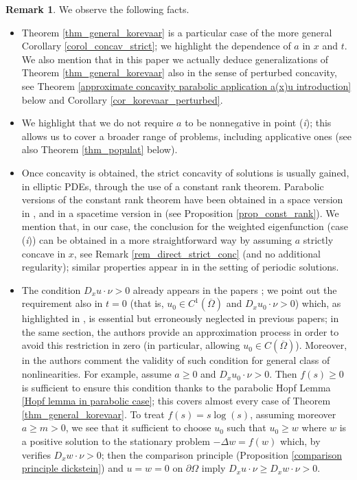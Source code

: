 \documentclass[11pt, reqno]{amsart}
\theoremstyle{definition}
\newtheorem{remark}[lemma]{Remark}
\numberwithin{equation}{section}
\newcommand{\Omegabar}{\overline{\Omega}}
\begin{document}
\begin{remark}
We observe the following facts.
\begin{itemize}
\item Theorem \ref{thm_general_korevaar} is a particular case of the more general Corollary \ref{corol_concav_strict}; we highlight the dependence of $a$ in $x$ and $t$. 
We also mention that in this paper we actually deduce generalizations of Theorem \ref{thm_general_korevaar} also in the sense of perturbed concavity, see Theorem \ref{approximate concavity parabolic application a(x)u introduction} below and Corollary \ref{cor_korevaar_perturbed}.

\item We highlight that we do not require $a$ to be nonnegative in point (\textit{i}); this allows us to cover a broader range of problems, including applicative ones (see also Theorem \ref{thm_populat} below).


\item Once concavity is obtained, the strict concavity of solutions is usually gained, in elliptic PDEs, through the use of a constant rank theorem. 
Parabolic versions of the constant rank theorem have been obtained in a space version in \cite{BianGuan2009, CaffareliGuanMa2007}, and in a spacetime version in \cite{chen2014, ChenHu2013} (see Proposition \ref{prop_const_rank}). 
We mention that, in our case, the conclusion for the weighted eigenfunction (case (\textit{i})) can be obtained in a more straightforward way by assuming $a$ strictly concave in $x$, see Remark \ref{rem_direct_strict_conc} (and no additional regularity); similar properties appear in \cite{Bitterlin92} in the setting of periodic solutions.

\item The condition $D_x u \cdot \nu >0$ already appears in the papers \cite{GrecoKawohl,Korevaar}; we point out the requirement also in $t=0$ (that is, $u_0 \in C^1(\Omegabar)$ and $D_x u_0 \cdot \nu >0$) which, as highlighted in \cite[Section 6]{GrecoKawohl}, is essential but erroneously neglected in previous papers; in the same section, the authors provide an approximation process in order to avoid this restriction in zero (in particular, allowing $u_0 \in C(\Omegabar)$). 
Moreover, in \cite[Remark 2, page 7]{GrecoKawohl} the authors comment the validity of such condition for general class of nonlinearities.
For example, assume $a \geq 0$ and $D_x u_0 \cdot \nu >0$. Then $f(s) \geq 0$ is sufficient to ensure this condition thanks to the parabolic Hopf Lemma \ref{Hopf lemma in parabolic case}; this covers almost every case of Theorem \ref{thm_general_korevaar}. 
To treat $f(s)=s \log(s)$, assuming moreover $a \geq m >0$, we see that it sufficient to choose $u_0$ such that $u_0 \geq w$ where $w$ is a positive solution to the stationary problem $-\Delta w = f(w)$ which, by \cite[Theorem 2]{Vazquez2014} verifies $D_x w \cdot \nu >0$; then the comparison principle (Proposition \ref{comparison principle dickstein}) and $u=w=0$ on $\partial \Omega$ imply $D_x u \cdot \nu \geq D_x w \cdot \nu >0$.


\end{itemize}
\end{remark}
\end{document}
